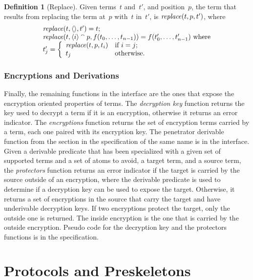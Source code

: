 \documentclass[12pt]{report}
\theoremstyle{definition}
\newtheorem{defn}{Definition}[chapter]
\begin{document}
\begin{defn}[Replace]
Given terms~$t$ and~$t'$, and position~$p$, the term that results from
replacing the term at~$p$ with~$t$ in~$t'$, is
$\operatorname{\mathit{replace}}(t,p,t')$, where
$$\begin{array}{l}
\operatorname{\mathit{replace}}(t,\langle\rangle,t')=t;\\
\operatorname{\mathit{replace}}(t,\langle i\rangle\mathbin{{}^\smallfrown} p,f(t_0,\ldots,t_{n-1}))=
f(t'_0,\ldots,t'_{n-1})\mbox{ where}\\
t'_j=\left\{
\begin{array}{ll}
\operatorname{\mathit{replace}}(t,p,t_i)&\mbox{if $i=j$;}\\
t_j&\mbox{otherwise.}
\end{array}\right.
\end{array}$$
\end{defn}

\subsection{Encryptions and Derivations}\label{sec:encryptions}

Finally, the remaining functions in the interface are the ones that
expose the encryption oriented properties of terms.  The
\emph{decryption key} function returns the key used to decrypt a term
if it is an encryption, otherwise it returns an error indicator.  The
\emph{encryptions} function returns the set of encryption terms
carried by a term, each one paired with its encryption key.  The
penetrator derivable function from the section in the specification of
the same name is in the interface.  Given a derivable predicate that
has been specialized with a given set of supported terms and a set of
atoms to avoid, a target term, and a source term, the
\emph{protectors} function returns an error indicator if the target is
carried by the source outside of an encryption, where the derivable
predicate is used to determine if a decryption key can be used to
expose the target.  Otherwise, it returns a set of encryptions in the
source that carry the target and have underivable decryption keys.  If
two encryptions protect the target, only the outside one is returned.
The inside encryption is the one that is carried by the outside
encryption.  Pseudo code for the decryption key and the protectors
functions is in the specification.

\chapter{Protocols and Preskeletons}\label{cha:prots and preskels}
\end{document}
